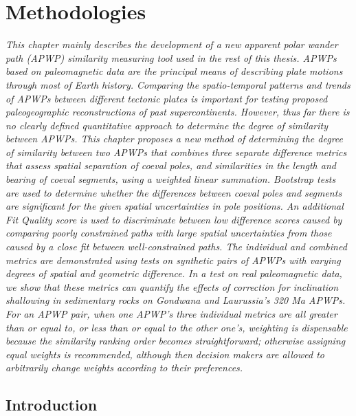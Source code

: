 \chapter{Methodologies}\label{chap:Metho}
\textit{This chapter mainly describes the development of a new apparent polar
wander path (APWP) similarity measuring tool used in the rest of this thesis.
APWPs based on paleomagnetic data are the principal means of describing plate
motions through most of Earth history. Comparing the spatio-temporal patterns
and trends of APWPs between different tectonic plates is important for testing
proposed paleogeographic reconstructions of past supercontinents. However, thus
far there is no clearly defined quantitative approach to determine the degree of
similarity between APWPs. This chapter proposes a new method of determining the
degree of similarity between two APWPs that combines three separate difference
metrics that assess spatial separation of coeval poles, and similarities in the
length and bearing of coeval segments, using a weighted linear summation.
Bootstrap tests are used to determine whether the differences between coeval
poles and segments are significant for the given spatial uncertainties in pole
positions. An additional Fit Quality score is used to discriminate between low
difference scores caused by comparing poorly constrained paths with large
spatial uncertainties from those caused by a close fit between well-constrained
paths. The individual and combined metrics are demonstrated using tests on
synthetic pairs of APWPs with varying degrees of spatial and geometric
difference. In a test on real paleomagnetic data, we show that these metrics can
quantify the effects of correction for inclination shallowing in sedimentary
rocks on Gondwana and Laurussia's 320 Ma APWPs. For an APWP pair,
when one APWP's three individual metrics are all greater than or equal to, or
less than or equal to the other one's, weighting is dispensable because the
similarity ranking order becomes straightforward; otherwise assigning equal
weights is recommended, although then decision makers are allowed to arbitrarily
change weights according to their preferences.}
\vfill
\minitoc\newpage

\section{Introduction}

